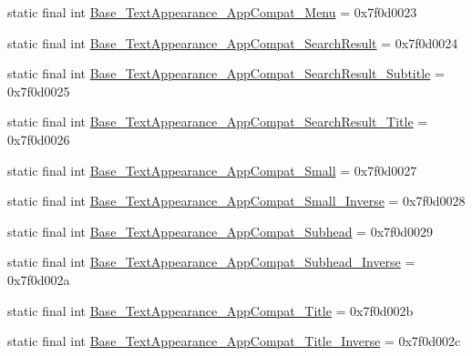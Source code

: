 \begin{DoxyCompactItemize}
\item 
static final int \mbox{\hyperlink{classandroid_1_1support_1_1v7_1_1appcompat_1_1R_1_1style_a157293841296e17ba91feda6068d283f}{Base\+\_\+\+Text\+Appearance\+\_\+\+App\+Compat\+\_\+\+Menu}} = 0x7f0d0023
\item 
static final int \mbox{\hyperlink{classandroid_1_1support_1_1v7_1_1appcompat_1_1R_1_1style_abe1dd23402a2ed299ed4cba9cf8bdb7f}{Base\+\_\+\+Text\+Appearance\+\_\+\+App\+Compat\+\_\+\+Search\+Result}} = 0x7f0d0024
\item 
static final int \mbox{\hyperlink{classandroid_1_1support_1_1v7_1_1appcompat_1_1R_1_1style_afee2e2bbe4a577ea3cc8ddcd4101a2af}{Base\+\_\+\+Text\+Appearance\+\_\+\+App\+Compat\+\_\+\+Search\+Result\+\_\+\+Subtitle}} = 0x7f0d0025
\item 
static final int \mbox{\hyperlink{classandroid_1_1support_1_1v7_1_1appcompat_1_1R_1_1style_a58274985c9e5e9b0b52989240ef93e73}{Base\+\_\+\+Text\+Appearance\+\_\+\+App\+Compat\+\_\+\+Search\+Result\+\_\+\+Title}} = 0x7f0d0026
\item 
static final int \mbox{\hyperlink{classandroid_1_1support_1_1v7_1_1appcompat_1_1R_1_1style_ac1093d122fc007f82bf35e4bdd089958}{Base\+\_\+\+Text\+Appearance\+\_\+\+App\+Compat\+\_\+\+Small}} = 0x7f0d0027
\item 
static final int \mbox{\hyperlink{classandroid_1_1support_1_1v7_1_1appcompat_1_1R_1_1style_ad2befb41e28e52eed35c0e927dfd9d5e}{Base\+\_\+\+Text\+Appearance\+\_\+\+App\+Compat\+\_\+\+Small\+\_\+\+Inverse}} = 0x7f0d0028
\item 
static final int \mbox{\hyperlink{classandroid_1_1support_1_1v7_1_1appcompat_1_1R_1_1style_a0a4cf7b167f6f4d59fbfbcd4d755e48c}{Base\+\_\+\+Text\+Appearance\+\_\+\+App\+Compat\+\_\+\+Subhead}} = 0x7f0d0029
\item 
static final int \mbox{\hyperlink{classandroid_1_1support_1_1v7_1_1appcompat_1_1R_1_1style_aa148f2da1dd47d8c68ab864b270466ce}{Base\+\_\+\+Text\+Appearance\+\_\+\+App\+Compat\+\_\+\+Subhead\+\_\+\+Inverse}} = 0x7f0d002a
\item 
static final int \mbox{\hyperlink{classandroid_1_1support_1_1v7_1_1appcompat_1_1R_1_1style_aa5988904fde7a159365b0ae10f2ae9ac}{Base\+\_\+\+Text\+Appearance\+\_\+\+App\+Compat\+\_\+\+Title}} = 0x7f0d002b
\item 
static final int \mbox{\hyperlink{classandroid_1_1support_1_1v7_1_1appcompat_1_1R_1_1style_a6ce7242b318c13a6a38d536cae248d89}{Base\+\_\+\+Text\+Appearance\+\_\+\+App\+Compat\+\_\+\+Title\+\_\+\+Inverse}} = 0x7f0d002c
\item 

\end{DoxyCompactItemize}
